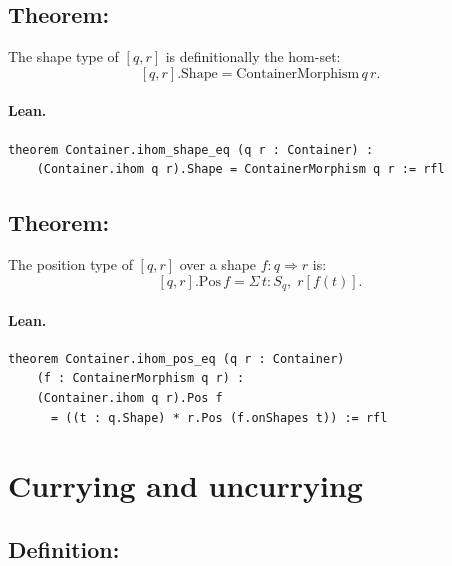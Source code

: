 \documentclass[11pt,a4paper]{article}
\begin{document}
\subsection{Theorem: }

\begin{thm}
The shape type of $[q, r]$ is definitionally the hom-set:
\[
  [q, r].\mathrm{Shape} = \mathrm{ContainerMorphism}\,q\,r.
\]
\end{thm}

\paragraph{Lean.}
\begin{lstlisting}[style=lean]
theorem Container.ihom_shape_eq (q r : Container) :
    (Container.ihom q r).Shape = ContainerMorphism q r := rfl
\end{lstlisting}


\subsection{Theorem: }

\begin{thm}
The position type of $[q, r]$ over a shape $f : q \Rightarrow r$ is:
\[
  [q, r].\mathrm{Pos}\,f = \Sigma\,t : S_q,\; r[f(t)].
\]
\end{thm}

\paragraph{Lean.}
\begin{lstlisting}[style=lean]
theorem Container.ihom_pos_eq (q r : Container)
    (f : ContainerMorphism q r) :
    (Container.ihom q r).Pos f
      = ((t : q.Shape) * r.Pos (f.onShapes t)) := rfl
\end{lstlisting}


\section{Currying and uncurrying}

\subsection{Definition: }
\end{document}
